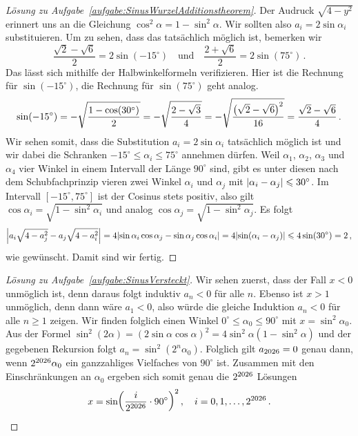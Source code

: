 \begin{proof}[Lösung zu Aufgabe~\ref{aufgabe:SinusWurzelAdditionstheorem}]
	Der Audruck $\sqrt{4-y^2}$ erinnert uns an die Gleichung $\cos^2\alpha=1-\sin^2\alpha$. Wir sollten also $a_i=2\sin\alpha_i$ substituieren. Um zu sehen, dass das tatsächlich möglich ist, bemerken wir
	\begin{equation*}
		\frac{\sqrt{2}-\sqrt{6}}{2}=2\sin(-15^\circ)\quad\text{und}\quad \frac{2+\sqrt{6}}{2}=2\sin(75^\circ)\,.
	\end{equation*}
	Das lässt sich mithilfe der Halbwinkelformeln verifizieren. Hier ist die Rechnung für $\sin(-15^\circ)$, die Rechnung für $\sin(75^\circ)$ geht analog.
	\begin{equation*}
		\sin(-15^\circ)=-\sqrt{\frac{1-\cos(30^\circ)}{2}}=-\sqrt{\frac{2-\sqrt{3}}{4}}=-\sqrt{\frac{\parens*{\sqrt{2}-\sqrt{6}}^2}{16}}=\frac{\sqrt{2}-\sqrt{6}}{4}\,.
	\end{equation*}
	Wir sehen somit, dass die Substitution $a_i=2\sin\alpha_i$ tatsächlich möglich ist und wir dabei die Schranken $-15^\circ\leqslant \alpha_i\leqslant 75^\circ$ annehmen dürfen. Weil $\alpha_1$, $\alpha_2$, $\alpha_3$ und $\alpha_4$ vier Winkel in einem Intervall der Länge $90^\circ$ sind, gibt es unter diesen nach dem Schubfachprinzip vieren zwei Winkel $\alpha_i$ und $\alpha_j$ mit $\abs{\alpha_i-\alpha_j}\leqslant 30^\circ$. Im Intervall $[-15^\circ,75^\circ]$ ist der Cosinus stets positiv, also gilt $\cos \alpha_i=\sqrt{1-\sin^2\alpha_i}$ und analog $\cos \alpha_j=\sqrt{1-\sin^2\alpha_j}$. Es folgt
	\begin{equation*}
		\abs*{a_i\sqrt{4-a_j^2}-a_j\sqrt{4-a_i^2}}=4\abs*{\sin\alpha_i\cos\alpha_j-\sin\alpha_j\cos\alpha_i}=4\abs*{\sin(\alpha_i-\alpha_j)}\leqslant 4\sin(30^\circ)=2\,,
	\end{equation*}
	wie gewünscht. Damit sind wir fertig.
\end{proof}

\begin{proof}[Lösung zu Aufgabe~\ref{aufgabe:SinusVersteckt}]
	Wir sehen zuerst, dass der Fall $x<0$ unmöglich ist, denn daraus folgt induktiv $a_n<0$ für alle $n$. Ebenso ist $x>1$ unmöglich, denn dann wäre $a_1<0$, also würde die gleiche Induktion $a_n<0$ für alle $n\geqslant 1$ zeigen. Wir finden folglich einen Winkel $0^\circ\leqslant \alpha_0\leqslant 90^\circ$ mit $x=\sin^2\alpha_0$. Aus der Formel $\sin^2(2\alpha)=(2\sin\alpha\cos\alpha)^2=4\sin^2\alpha(1-\sin^2\alpha)$ und der gegebenen Rekursion folgt $a_n=\sin^2(2^n\alpha_0)$. Folglich gilt $a_{\the\year}=0$ genau dann, wenn $2^{\the\year}\alpha_0$ ein ganzzahliges Vielfaches von $90^\circ$ ist. Zusammen mit den Einschränkungen an $\alpha_0$ ergeben sich somit genau die $2^{\the\year}$ Lösungen
	\begin{equation*}
		x=\sin\parens*{\frac{i}{2^{\the\year}}\cdot 90^\circ}^2\,,\quad i=0,1,\dotsc,2^{\the\year}\,.\qedhere
	\end{equation*}
\end{proof}


